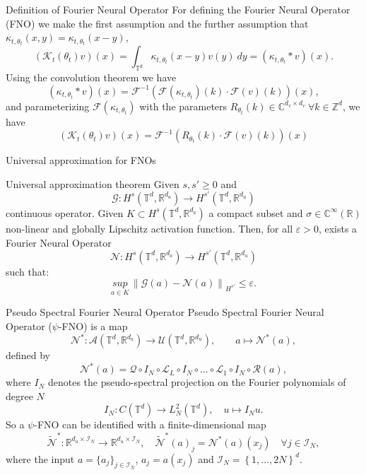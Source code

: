 \documentclass{beamer}
\newcommand{\numberset}{\mathbb}
\newcommand{\Z}{\numberset{Z}}
\newcommand{\R}{\numberset{R}}
\newcommand{\C}{\numberset{C}}
\begin{document}
\begin{frame}{Definition of Fourier Neural Operator}
	For defining the Fourier Neural Operator (FNO) we make the first assumption and the further assumption that $\kappa_{t,\theta_t}(x, y) = \kappa_{t,\theta_t}(x -y)$,
	\[ (\mathcal{K}_t(\theta_t)v)(x) = \int_{\mathbb{T}^d} \kappa_{t,\theta_t}(x-y) v(y) \ dy = (\kappa_{t, \theta_t} * v)(x)  .\]
	\pause
	Using the convolution theorem we have
	\[ (\kappa_{t, \theta_t} * v)(x) =  \mathcal{F}^{-1}\left( \mathcal{F}( \kappa_{t,\theta_t}) (k) \cdot \mathcal{F}(v)(k) \right)(x), \]
	and parameterizing $\mathcal{F}( \kappa_{t, \theta_t} )$ with the parameters $R_{\theta_t}(k) \in \C^{d_v \times d_v} \ \forall k \in \Z^d $, we have 
	\[  (\mathcal{K}_t(\theta_t)v)(x)= \mathcal{F}^{-1}\left( R_{\theta_t}(k) \cdot \mathcal{F}(v)(k) \right)(x) \]
\end{frame}


\begin{frame}{Universal approximation for FNOs}%
\begin{themedTitleBlock}{Universal approximation theorem} %
	Given $ s, s' \ge 0 $ and 
	\[ \mathcal{G}: H^s(\mathbb{T}^d, \R^{d_a}) \to H^{s'}(\mathbb{T}^d, \R^{d_u}) \]
	continuous operator. Given $ K \subset H^s(\mathbb{T}^d, \R^{d_a}) $ a compact subset and $ \sigma \in \C^{\infty}(\R) $ non-linear and globally Lipschitz activation function. Then, for all $ \varepsilon > 0 $, exists a Fourier Neural Operator
	\[ \mathcal{N}: H^s(\mathbb{T}^d, \R^{d_a}) \to H^{s'}(\mathbb{T}^d, \R^{d_u}) \]
	such that:
	\[ \underset{a \in K}{sup}\, \left\| \mathcal{G}(a) - \mathcal{N}(a) \right\|_{H^{s'}} \le \varepsilon.  \]
\end{themedTitleBlock}	
\end{frame}


\begin{frame}{Pseudo Spectral Fourier Neural Operator}
	Pseudo Spectral Fourier Neural Operator ($\psi$-FNO) is a map
	\[ \mathcal{N}^{*}: \mathcal{A}(\mathbb{T}^d, \R^{d_a}) \to \mathcal{U}(\mathbb{T}^d, \R^{d_u}), \qquad a \mapsto \mathcal{N}^{*}(a), \]
	defined by	
	\[\mathcal{N}^{*}(a) = \mathcal{Q} \circ I_N \circ \mathcal{L}_L \circ I_N \circ \dots \circ \mathcal{L}_1 \circ I_N \circ \mathcal{R}(a),	\]
	where $ I_N $ denotes the pseudo-spectral projection on the Fourier polynomials of degree $N$
	\[ I_N : C(\mathbb{T}^d) \to L^{2}_{N}(\mathbb{T}^{d}), \quad u \mapsto I_Nu. \]
	\pause
	So a $ \psi $-FNO can be identified with a finite-dimensional map 
	\[ \widetilde{\mathcal{N}}^{*}: \R^{d_a \times \mathcal{I}_N} \to \R^{d_u \times \mathcal{I}_N}, \quad \widetilde{\mathcal{N}}^{*}(a)_j = \mathcal{N}^{*}(a)(x_j) \quad \forall j \in \mathcal{I}_N, \]
	where the input $a = \{a_j\}_{j\in \mathcal{I}_N}$, $a_j = a(x_j)$ and $ \mathcal{I}_N = \left\lbrace 1, \dots, 2N \right\rbrace^d $.
\end{frame}
\end{document}
